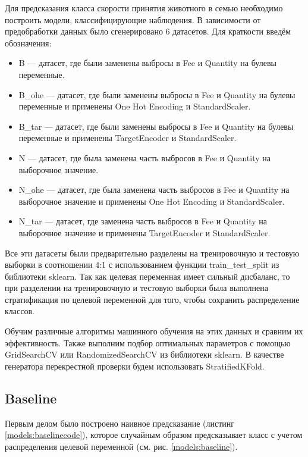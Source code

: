 \documentclass[14pt]{mmcs_article}
\begin{document}
Для предсказания класса скорости принятия животного в семью необходимо построить модели, классифицирующие наблюдения. В зависимости от предобработки данных было сгенерировано 6 датасетов. Для краткости введём обозначения: 

\begin{itemize}
	\item B --- датасет, где были заменены выбросы в Fee и Quantity на булевы переменные.
	\item B\_ohe --- датасет, где были заменены выбросы в Fee и Quantity на булевы переменные и применены One Hot Encoding и StandardScaler.
	\item B\_tar --- датасет, где были заменены выбросы в Fee и Quantity на булевы переменные и применены TargetEncoder и StandardScaler.
	\item N — датасет, где была заменена часть выбросов в Fee и Quantity на выборочное значение. 
	\item N\_ohe --- датасет, где была заменена часть выбросов в Fee и Quantity на выборочное значение и применены One Hot Encoding и StandardScaler.
	\item N\_tar --- датасет, где заменена часть выбросов в Fee и Quantity на выборочное значение и применены TargetEncoder и StandardScaler.
\end{itemize}

Все эти датасеты были предварительно разделены на тренировочную и тестовую выборки в соотношении 4:1 с использованием функции train\_test\_split из библиотеки sklearn. Так как целевая переменная имеет сильный дисбаланс, то при разделении на тренировочную и тестовую выборки была выполнена стратификация по целевой переменной для того, чтобы сохранить распределение классов.

Обучим различные алгоритмы машинного обучения на этих данных и сравним их эффективность. Также выполним подбор оптимальных параметров с помощью GridSearchCV или RandomizedSearchCV из библиотеки sklearn. В качестве генератора перекрестной проверки будем использовать StratifiedKFold.


\subsection{Baseline}

Первым делом было построено наивное предсказание (листинг \ref{models:baselinecode}), которое случайным образом предсказывает класс с учетом распределения целевой переменной (см. рис. \ref{models:baseline}).
\end{document}
